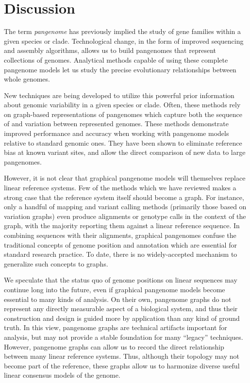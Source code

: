 \section{Discussion}
\label{sec:discussion}

The term \emph{pangenome} has previously implied the study of gene families within a given species or clade.
Technological change, in the form of improved sequencing and assembly algorithms, allows us to build pangenomes that represent collections of genomes.
Analytical methods capable of using these complete pangenome models let us study the precise evolutionary relationships between whole genomes.

New techniques are being developed to utilize this powerful prior information about genomic variability in a given species or clade.
Often, these methods rely on graph-based representations of pangenomes which capture both the sequence of and variation between represented genomes.
These methods demonstrate improved performance and accuracy when working with pangenome models relative to standard genomic ones.
They have been shown to eliminate reference bias at known variant sites, and allow the direct comparison of new data to large pangenomes.

However, it is not clear that graphical pangenome models will themselves replace linear reference systems.
Few of the methods which we have reviewed makes a strong case that the reference system itself should become a graph.
For instance, only a handful of mapping and variant calling methods (primarily those based on variation graphs) even produce alignments or genotype calls in the context of the graph, with the majority reporting them against a linear reference sequence.
In combining sequences with their alignments, graphical pangenomes confuse the traditional concepts of genome position and annotation which are essential for standard research practice.
To date, there is no widely-accepted mechanism to generalize such concepts to graphs.

We speculate that the status quo of genome positions on linear sequences may continue long into the future, even if graphical pangenome models become essential to many kinds of analysis.
On their own, pangenome graphs do not represent any directly measurable aspect of a biological system, and thus their construction and design is guided more by application than any kind of ground truth.
In this view, pangenome graphs are technical artifacts important for analysis, but may not provide a stable foundation for many ``legacy'' techniques.
However, pangenome graphs can allow us to record the direct relationship between many linear reference systems.
Thus, although their topology may not become part of the reference, these graphs allow us to harmonize diverse useful linear consensus models of the genome.

